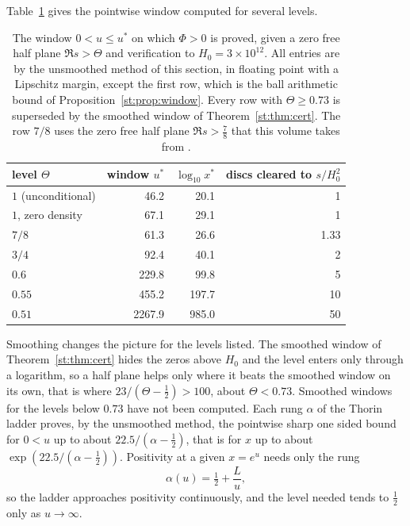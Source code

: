 Table~\ref{st:tab:region} gives the pointwise window computed for several levels.
\begin{table}[h]\centering\small
\begin{tabular}{lrrr}
\toprule
level $\Theta$ & window $u^*$ & $\log_{10}x^*$ & discs cleared to $s/H_0^2$\\
\midrule
$1$ (unconditional) & 46.2 & 20.1 & 1\\
$1$, zero density & 67.1 & 29.1 & 1\\
$7/8$ & 61.3 & 26.6 & 1.33\\
$3/4$ & 92.4 & 40.1 & 2\\
$0.6$ & 229.8 & 99.8 & 5\\
$0.55$ & 455.2 & 197.7 & 10\\
$0.51$ & 2267.9 & 985.0 & 50\\
\bottomrule
\end{tabular}
\caption{The window $0<u\le u^*$ on which $\Phi>0$ is proved, given a zero free half plane $\Re s>\Theta$ and verification to $H_0=3\times10^{12}$. All entries are by the unsmoothed method of this section, in floating point with a Lipschitz margin, except the first row, which is the ball arithmetic bound of Proposition~\ref{st:prop:window}. Every row with $\Theta\ge0.73$ is superseded by the smoothed window of Theorem~\ref{st:thm:cert}. The row $7/8$ uses the zero free half plane $\Re s>\tfrac78$ that this volume takes from \cite{OAI26a}.}\label{st:tab:region}
\end{table}
Smoothing changes the picture for the levels listed. The smoothed window of Theorem~\ref{st:thm:cert} hides the zeros above $H_0$ and the level enters only through a logarithm, so a half plane helps only where it beats the smoothed window on its own, that is where $23/(\Theta-\tfrac12)>100$, about $\Theta<0.73$. Smoothed windows for the levels below $0.73$ have not been computed.
Each rung $\alpha$ of the Thorin ladder proves, by the unsmoothed method, the pointwise sharp one sided bound for $0<u$ up to about $22.5/(\alpha-\tfrac12)$, that is for $x$ up to about $\exp(22.5/(\alpha-\tfrac12))$. Positivity at a given $x=e^u$ needs only the rung
\[
\alpha(u)=\tfrac12+\frac{L}{u},
\]
so the ladder approaches positivity continuously, and the level needed tends to $\tfrac12$ only as $u\to\infty$.
